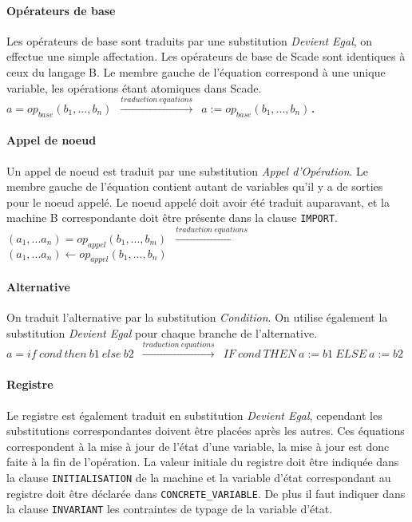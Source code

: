 \paragraph{Opérateurs de base}
Les opérateurs de base sont traduits par une substitution \emph{Devient Egal}, on
effectue une simple affectation. Les opérateurs de base de Scade sont identiques
à ceux du langage B. Le membre gauche de l'équation correspond à une unique
variable, les opérations étant atomiques dans Scade. \\

\texttt{$a = op_{base}(b_1,...,b_n)$ $\xrightarrow{traduction ~
equations}$ $a:=op_{base}(b_1,...,b_n)$. }

\paragraph{Appel de noeud}
Un appel de noeud est traduit par une substitution \emph{Appel d'Opération}. Le
membre gauche de l'équation contient autant de variables qu'il y a de sorties
pour le noeud appelé. Le noeud appelé doit avoir été traduit auparavant, et la
machine B correspondante doit être présente dans la clause \texttt{IMPORT}.\\

\texttt{$(a_1, ... a_n) = op_{appel}(b_1, ..., b_m)$
$\xrightarrow{traduction ~ equations}$ $(a_1, ... a_n) \leftarrow
op_{appel}(b_1,..., b_n)$} 

\paragraph{Alternative}
On traduit l'alternative par la substitution \emph{Condition}. On utilise
également la substitution \emph{Devient Egal} pour chaque branche de l'alternative.\\

\texttt{$ a = if~ cond~ then~ b1~ else~ b2$ $\xrightarrow{traduction ~ equations}$ $IF ~cond~ THEN ~a:=b1~ ELSE
~a:=b2$}

\paragraph{Registre}
Le registre est également traduit en substitution \emph{Devient Egal}, cependant
les substitutions correspondantes doivent être placées après les autres. Ces
équations correspondent à la mise à jour de l'état d'une variable, la mise à
jour est donc faite à la fin de l'opération. La valeur initiale du registre doit
être indiquée dans la clause \texttt{INITIALISATION} de la machine et la variable d'état
correspondant au registre doit être déclarée dans \texttt{CONCRETE\_VARIABLE}. De
plus il faut indiquer dans la clause \texttt{INVARIANT} les contraintes de typage
de la variable d'état. \\

